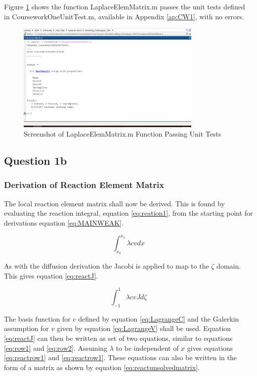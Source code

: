 \documentclass[11pt]{article}
\begin{document}
Figure \ref{fig:passTest1} shows the function LaplaceElemMatrix.m passes the unit tests defined in CourseworkOneUnitTest.m, available in Appendix \ref{ap:CW1}, with no errors.

\begin{figure}[h!]
	\centering
	\includegraphics[width=0.8\textwidth]{CW1Test.PNG}
	\caption{Screenshot of LaplaceElemMatrix.m Function Passing Unit Tests}\label{fig:passTest1}
\end{figure}



\subsection{Question 1b}
\subsubsection{Derivation of Reaction Element Matrix}

The local reaction element matrix shall now be derived. This is found by evaluating the reaction integral, equation \ref{eq:reation1}, from the starting point for derivations equation \ref{eq:MAINWEAK}.

\begin{equation} \label{eq:reation1}
\int_{x_{0}}^{x_{1}} \lambda c v  dx
\end{equation}

As with the diffusion derivation the Jacobi is applied to map to the $\zeta$ domain. This gives equation \ref{eq:reactJ}.

\begin{equation}
\label{eq:reactJ}
\int_{-1}^1 \lambda c v J d\zeta
\end{equation}

The basis function for $c$ defined by equation \ref{eq:LagrangeC} and the Galerkin assumption for $v$ given by equation \ref{eq:LagrangeV} shall be used. Equation \ref{eq:reactJ} can then be written as set of two equations, similar to equations \ref{eq:row1} and \ref{eq:row2}. Assuming $\lambda$ to be independent of $x$ gives equations \ref{eq:reactrow1} and \ref{eq:reactrow1}. These equations can also be written in the form of a matrix as shown by equation \ref{eq:reactunsolvedmatrix}.
\end{document}
